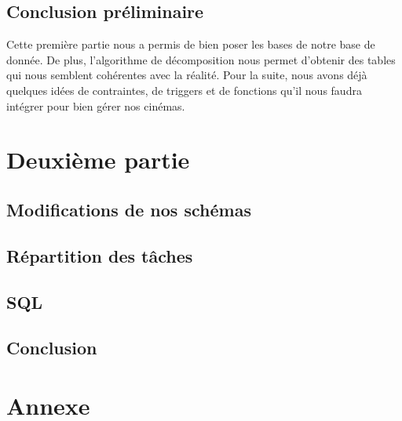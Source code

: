 \documentclass[a4paper,sffamily,12pt]{article}
\begin{document}
	
			\newpage
	
			\subsection{Conclusion préliminaire}
	
				\vspace{0.5cm}
				
				Cette première partie nous a permis de bien poser les bases de notre base de donnée. De plus, l'algorithme de décomposition nous permet d'obtenir des tables qui nous semblent cohérentes avec la réalité. Pour la suite, nous avons déjà quelques idées de contraintes, de triggers et de fonctions qu'il nous faudra intégrer pour bien gérer nos cinémas. \\			

			\newpage

	\section{Deuxième partie}

		\vspace{0.5cm}

		\subsection{Modifications de nos schémas}			

				\vspace{0.5cm}

		\subsection{Répartition des tâches}

				\vspace{0.5cm}

		\subsection{SQL}

				\vspace{0.5cm}

		\subsection{Conclusion}

				\vspace{0.5cm}

			\section{Annexe}
							
\end{document}
